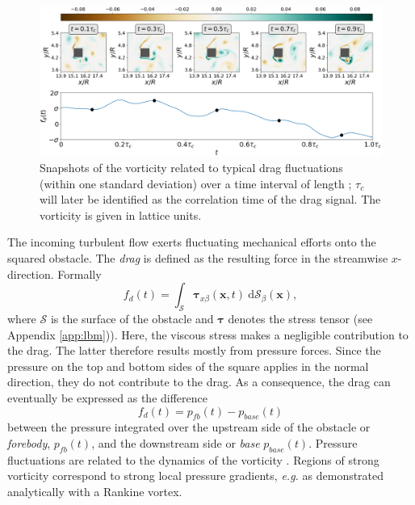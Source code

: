 \documentclass{jfm}
\newcommand{\EL}[1]{{\color{myred}{#1}}}
\begin{document}
\begin{figure}
	\centering
	\includegraphics[width=\linewidth]{ecoulement_typique/ecoulement_typique.png}
	\caption{Snapshots of the vorticity related to typical drag fluctuations (within one standard deviation) over a time interval of length \EL{$\tau_c \simeq 4T_0$}; $\tau_c$ will later be identified as the correlation time of the drag signal.
		The vorticity is given in lattice units.}
	\label{fig:typical_vorticity}
\end{figure}


%
The incoming turbulent flow exerts fluctuating mechanical efforts onto the squared obstacle.
The \textit{drag} is defined as the resulting force in the streamwise $x$-direction. Formally
\begin{equation}
\label{eq:drag_definition}
f_d(t) = \int_{\mathcal{S}} \boldsymbol{\tau}_{x \beta}(\mathbf{x},t) ~ \mathrm{d}{\mathcal{S}}_\beta(\mathbf{x}),
\end{equation}
where $\mathcal{S}$ is the surface of the obstacle and $\boldsymbol{\tau}$ denotes the stress tensor (see Appendix \ref{app:lbm})).
Here, the viscous stress makes a negligible contribution to the drag. The latter therefore results mostly from pressure forces.
%
Since the pressure on the top and bottom sides of the square applies in the normal direction, they do not contribute to the drag.
As a consequence, the drag can eventually be expressed as the difference
\begin{equation}
\label{eq:drag_approx}
f_d(t) = p_{fb}(t) - p_{base}(t)
\end{equation}
between the pressure integrated over the upstream side of the obstacle or \textit{forebody}, $p_{fb}(t)$, and the downstream side or \textit{base} $p_{base}(t)$.
Pressure fluctuations are related to the dynamics of the vorticity \EL{field}.
Regions of strong vorticity correspond to strong local pressure gradients, \emph{e.g.} as demonstrated analytically with a Rankine vortex.
%
%
\end{document}
